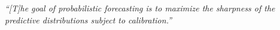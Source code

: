 \begin{resumo}[]

    \begin{flushright}
        \vspace{20cm}
        \begin{minipage}{12cm}\textit{``[T]he goal of probabilistic forecasting is to maximize the sharpness of the predictive distributions subject to calibration.''}\\[0.5\baselineskip]
        \cite[p.~359]{GNEITING2007}\end{minipage}
    \end{flushright}
\end{resumo}
